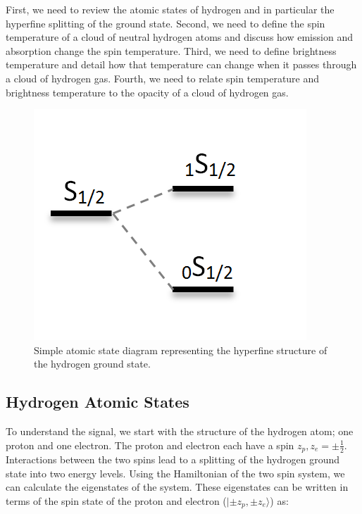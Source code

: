 First, we need to review the atomic states of hydrogen and in particular the \cm hyperfine splitting of the ground state. Second, we need to define the spin temperature of a cloud of neutral hydrogen atoms and discuss how emission and absorption change the spin temperature. Third, we need to define brightness temperature and detail how that temperature can change when it passes through a cloud of hydrogen gas. Fourth, we need to relate spin temperature and brightness temperature to the opacity of a cloud of hydrogen gas. 

\begin{figure}[htb]
\begin{center}
\includegraphics[width=0.95\linewidth]{Introduction/figures/1s_spin_states.png}
\caption{Simple atomic state diagram representing the hyperfine structure of the hydrogen ground state.}
\label{Fig:spin_states}
\end{center}
\end{figure}

\subsection{Hydrogen Atomic States}
To understand the \cm signal, we start with the structure of the hydrogen atom; one proton and one electron. The proton and electron each have a spin $z_p,z_e = \pm \frac{1}{2}$. Interactions between the two spins lead to a splitting of the hydrogen ground state into two energy levels. Using the Hamiltonian of the two spin system, we can calculate the eigenstates of the system. These eigenstates can be written in terms of the spin state of the proton and electron ($| \pm z_p, \pm z_e \rangle$) as:

